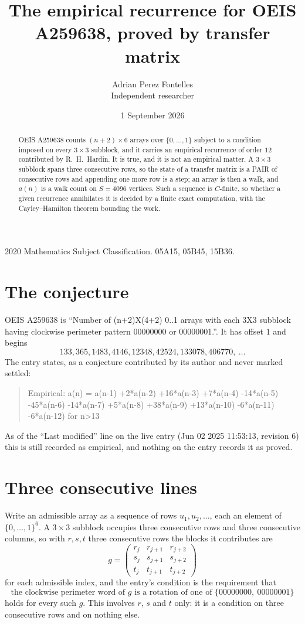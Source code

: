 \documentclass[11pt,a4paper]{article}
\title{The empirical recurrence for OEIS A259638, proved by transfer matrix}
\author{Adrian Perez Fontelles\\ \small Independent researcher}
\date{1 September 2026}
\theoremstyle{plain}
\theoremstyle{definition}
\begin{document}
\maketitle

\begin{abstract}
OEIS A259638 counts $(n+2)\times6$ arrays over $\{0,\dots,1\}$ subject to a condition imposed on
every $3\times3$ subblock, and it carries an empirical recurrence of order $12$
contributed by R.~H.~Hardin. It is true, and it is not an empirical matter. A $3\times3$
subblock spans three consecutive rows, so the state of a transfer matrix is a PAIR of
consecutive rows and appending one more row is a step; an array is then a walk, and
$a(n)$ is a walk count on $S=4096$ vertices. Such a sequence is $C$-finite, so whether a given
recurrence annihilates it is decided by a finite exact computation, with the Cayley--Hamilton
theorem bounding the work.
\end{abstract}

\noindent\small 2020 Mathematics Subject Classification. 05A15, 05B45, 15B36.\normalsize

\section{The conjecture}

OEIS A259638 is ``Number of (n+2)X(4+2) 0..1 arrays with each 3X3 subblock having clockwise perimeter pattern 00000000 or 00000001.''. It has offset $1$ and begins
\[
133, 365, 1483, 4146, 12348, 42524, 133078, 406770,\ \dots
\]
The entry states, as a conjecture contributed by its author and never marked settled:
\begin{quote}
Empirical: a(n) = a(n-1) +2*a(n-2) +16*a(n-3) +7*a(n-4) -14*a(n-5) -45*a(n-6) -14*a(n-7) +5*a(n-8) +38*a(n-9) +13*a(n-10) -6*a(n-11) -6*a(n-12) for n>13
\end{quote}
As of the ``Last modified'' line on the live entry (Jun 02 2025 11:53:13, revision 6) this is still
recorded as empirical, and nothing on the entry records it as proved.

\section{Three consecutive lines}

Write an admissible array as a sequence of rows $u_1,u_2,\dots$, each an element of
$\{0,\dots,1\}^{6}$. A $3\times3$ subblock occupies three consecutive rows and
three consecutive columns, so with $r,s,t$ three consecutive rows the blocks it
contributes are
\[
g=\begin{pmatrix}r_j&r_{j+1}&r_{j+2}\\ s_j&s_{j+1}&s_{j+2}\\ t_j&t_{j+1}&t_{j+2}\end{pmatrix}
\]
for each admissible index, and the entry's condition is the requirement that
\[
\text{the clockwise perimeter word of }g\text{ is a rotation of one of }\{00000000,\ 00000001\}
\]
holds for every such $g$. This involves $r$, $s$ and $t$ only: it is a condition on
three consecutive rows and on nothing else.
\end{document}
